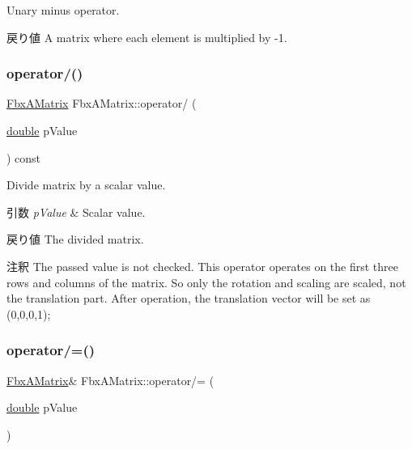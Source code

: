 Unary minus operator. \begin{DoxyReturn}{戻り値}
A matrix where each element is multiplied by -\/1. 
\end{DoxyReturn}
\mbox{\label{class_fbx_a_matrix_a48795bab1963bb8f5d963080f3d04149}} 
\subsubsection{\texorpdfstring{operator/()}{operator/()}}
{\footnotesize\ttfamily \hyperlink{class_fbx_a_matrix}{Fbx\+A\+Matrix} Fbx\+A\+Matrix\+::operator/ (\begin{DoxyParamCaption}\item[{\hyperlink{class_fbx_a_matrix_ad463edbb9fea344643297701f159faa7}{double}}]{p\+Value }\end{DoxyParamCaption}) const}

Divide matrix by a scalar value. 
\begin{DoxyParams}{引数}
{\em p\+Value} & Scalar value. \\
\hline
\end{DoxyParams}
\begin{DoxyReturn}{戻り値}
The divided matrix. 
\end{DoxyReturn}
\begin{DoxyRemark}{注釈}
The passed value is not checked. This operator operates on the first three rows and columns of the matrix. So only the rotation and scaling are scaled, not the translation part. After operation, the translation vector will be set as (0,0,0,1); 
\end{DoxyRemark}
\mbox{\label{class_fbx_a_matrix_af77d3a14cae3687b56d7e14e326473d6}} 
\subsubsection{\texorpdfstring{operator/=()}{operator/=()}}
{\footnotesize\ttfamily \hyperlink{class_fbx_a_matrix}{Fbx\+A\+Matrix}\& Fbx\+A\+Matrix\+::operator/= (\begin{DoxyParamCaption}\item[{\hyperlink{class_fbx_a_matrix_ad463edbb9fea344643297701f159faa7}{double}}]{p\+Value }\end{DoxyParamCaption})}

